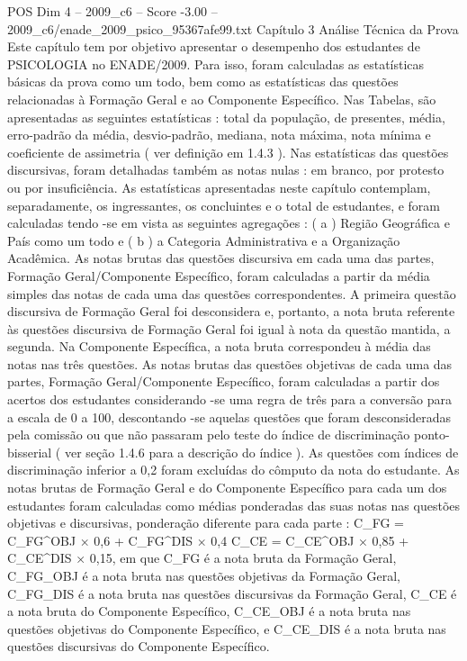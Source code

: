 \begin{textsample}{POS Dim 4 – 2009\_c6 – Score -3.00 – 2009\_c6/enade\_2009\_psico\_95367afe99.txt}  \label{ex:f4_pos_327}
Capítulo 3 Análise Técnica da Prova Este capítulo tem por objetivo apresentar o desempenho dos estudantes de PSICOLOGIA no ENADE/2009.
Para isso, foram calculadas as estatísticas básicas da prova como um todo, bem como as estatísticas das questões relacionadas à Formação Geral e ao Componente Específico.
Nas Tabelas, são apresentadas as seguintes estatísticas : total da população, de presentes, média, erro-padrão da média, desvio-padrão, mediana, nota máxima, nota mínima e coeficiente de assimetria ( ver definição em 1.4.3 ).
Nas estatísticas das questões discursivas, foram detalhadas também as notas nulas : em branco, por protesto ou por insuficiência.
As estatísticas apresentadas neste capítulo contemplam, separadamente, os ingressantes, os concluintes e o total de estudantes, e foram calculadas tendo -se em vista as seguintes agregações : ( a ) Região Geográfica e País como um todo e ( b ) a Categoria Administrativa e a Organização Acadêmica.
As notas brutas das questões discursiva em cada uma das partes, Formação Geral/Componente Específico, foram calculadas a partir da média simples das notas de cada uma das questões correspondentes.
A primeira questão discursiva de Formação Geral foi desconsidera e, portanto, a nota bruta referente às questões discursiva de Formação Geral foi igual à nota da questão mantida, a segunda.
Na Componente Específica, a nota bruta correspondeu à média das notas nas três questões.
As notas brutas das questões objetivas de cada uma das partes, Formação Geral/Componente Específico, foram calculadas a partir dos acertos dos estudantes considerando -se uma regra de três para a conversão para a escala de 0 a 100, descontando -se aquelas questões que foram desconsideradas pela comissão ou que não passaram pelo teste do índice de discriminação ponto-bisserial ( ver seção 1.4.6 para a descrição do índice ).
As questões com índices de discriminação inferior a 0,2 foram excluídas do cômputo da nota do estudante.
As notas brutas de Formação Geral e do Componente Específico para cada um dos estudantes foram calculadas como médias ponderadas das suas notas nas questões objetivas e discursivas, ponderação diferente para cada parte : C\_FG = C\_FG\textasciicircum{}OBJ × 0,6 + C\_FG\textasciicircum{}DIS × 0,4 C\_CE = C\_CE\textasciicircum{}OBJ × 0,85 + C\_CE\textasciicircum{}DIS × 0,15, em que C\_FG é a nota bruta da Formação Geral, C\_FG\_OBJ é a nota bruta nas questões objetivas da Formação Geral, C\_FG\_DIS é a nota bruta nas questões discursivas da Formação Geral, C\_CE é a nota bruta do Componente Específico, C\_CE\_OBJ é a nota bruta nas questões objetivas do Componente Específico, e C\_CE\_DIS é a nota bruta nas questões discursivas do Componente Específico.

\end{textsample}
